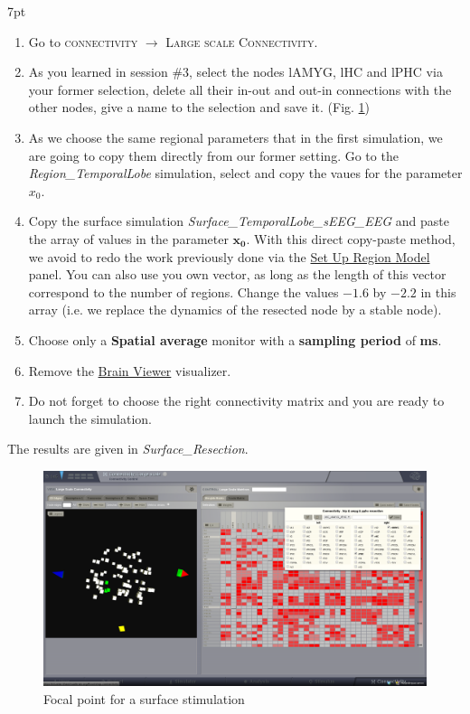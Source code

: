 \documentclass{tufte-handout}
\newenvironment{simulation}{%
  \def\FrameCommand{%
    \hspace{1pt}%
    {\color{ForestGreen}\vrule width 2pt}%
    {\color{simulationshade}\vrule width 4pt}%
    \colorbox{simulationshade}%
  }%
  \MakeFramed{\advance\hsize-\width\FrameRestore}%
  \noindent\hspace{-4.55pt}%
  \begin{adjustwidth}{}{7pt}%
  \vspace{2pt}\vspace{2pt}%
}
{%
  \vspace{2pt}\end{adjustwidth}\endMakeFramed%
}
\begin{document}
\begin{simulation}
  \begin{enumerate}
  \item Go to \textsc{connectivity} $\rightarrow$ \textsc{Large scale Connectivity}.
  \item As you learned in session \#3, select the nodes lAMYG, lHC and lPHC via your former selection, delete all their in-out and out-in connections
  with the other nodes, give a name to the selection and save it. (Fig. \ref{fig:resec})
  \item As we choose the same regional parameters that in the first simulation, we are going to copy them directly from our
  former setting. Go to the \textit{Region\_TemporalLobe} simulation, select and copy the vaues for the parameter  $x_0$. 
  \item Copy the surface simulation \textit{Surface\_TemporalLobe\_sEEG\_EEG} and paste the array of values in the parameter $\mathbf{x_0}$.
  With this direct copy-paste method, we avoid to redo the work previously done via the \underline{Set Up Region Model} panel.
  You can also use you own vector, as long as the length of this vector correspond to the number of regions.
  Change the values $\mathbf{-1.6}$ by $\mathbf{-2.2}$ in this array (i.e. we replace the dynamics of the resected node by a stable node).
  \item Choose only a \textbf{Spatial average} monitor with a \textbf{sampling period} of \textbf{\unit[1]{ms}}.
  \item Remove the \underline{Brain Viewer} visualizer.
  \item Do not forget to choose the right connectivity matrix and you are ready to launch the simulation.
  \end{enumerate}
\end{simulation}

The results are given in \textit{Surface\_Resection}.

\begin{figure}[h]
  \includegraphics[width=\linewidth]{Handout_UI_ModellingAnEpilepticPatient_ConnectivityMatrixResection}%
  \caption{Focal point for a surface stimulation}%
  \label{fig:resec}%
\end{figure}
\end{document}

